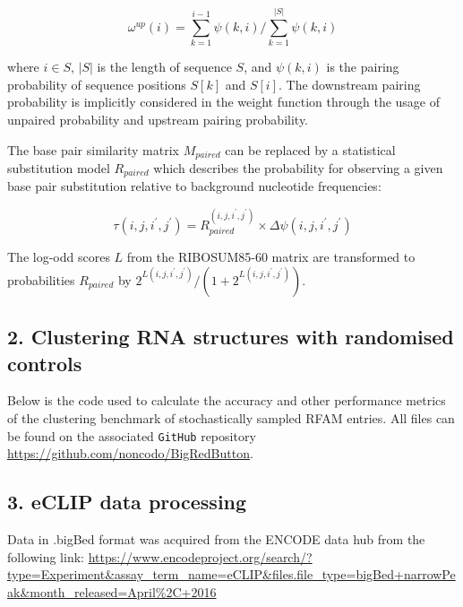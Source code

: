 \documentclass{bmcart}
\begin{document}
\begin{equation}\label{eq5}
	\omega^{up}(i) = \sum_{k=1}^{i-1} \psi(k,i) /
	\sum_{k=1}^{|S|} \psi(k,i)
\end{equation}

\noindent where $i \in S$, $|S|$ is the length of sequence $S$, and $\psi(k,i)$ is the
pairing probability of sequence positions $S[k]$ and $S[i]$. The downstream
pairing probability is implicitly considered in the weight function through the
usage of unpaired probability and upstream pairing probability.

\noindent The base pair similarity matrix
$M_{paired}$ can be replaced by a statistical substitution model $R_{paired}$
which describes the probability for observing a given base pair substitution
relative to background nucleotide frequencies:

\begin{equation}\label{eq10}
	\tau(i,j,i^\prime,j^\prime) = R_{paired}^{(i,j,i^\prime,j^\prime)}
\times \Delta \psi(i,j,i^\prime,j^\prime)
\end{equation}

\noindent The log-odd scores $L$ from the RIBOSUM85-60 matrix \cite{Klein14499004}
	are transformed to probabilities $R_{paired}$ by $2^{L(i,j,i^\prime,j^\prime)} / (1 + 2^{L(i,j,i^\prime,j^\prime)})$.\\


\subsection*{ 2. Clustering RNA structures with randomised controls }

Below is the code used to calculate the accuracy and other performance metrics of 
the clustering benchmark of stochastically sampled RFAM entries. All files can be found on the 
associated \texttt{GitHub} repository \url{https://github.com/noncodo/BigRedButton}.




\subsection*{ 3. eCLIP data processing }
Data in .bigBed format was acquired from the ENCODE data hub from the following link:
\url{https://www.encodeproject.org/search/?type=Experiment&assay_term_name=eCLIP&files.file_type=bigBed+narrowPeak&month_released=April\%2C+2016}
\end{document}

